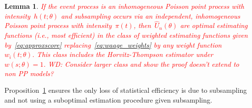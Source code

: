 \documentclass[12pt]{amsart}
\newtheorem{lemma}[thm]{Lemma}
\begin{document}
\begin{lemma} \normalfont
\label{prop:optimal}
\textcolor{red}{
If the event process is an inhomogeneous Poisson point process with intensity~$h(t; \theta)$ and subsampling occurs via an independent, inhomogeneous Poisson point process with intensity~$\pi (t)$, then~$\hat U_n (\theta)$ are optimal estimating functions (i.e., most efficient) in the class of weighted estimating functions given by~\eqref{eq:approxscore} replacing~\eqref{eq:waage_weights} by any weight function~$w_i (t; \theta)$. This class includes the Horvitz-Thompson estimator under~$w(s; \theta) = 1$.
WD: Consider larger class and show the proof doesn't extend to non PP models?}
\end{lemma}

\noindent Proposition~\ref{prop:optimal} ensures the only loss of statistical efficiency is due to subsampling and not using a suboptimal estimation procedure given subsampling.



\end{document}
